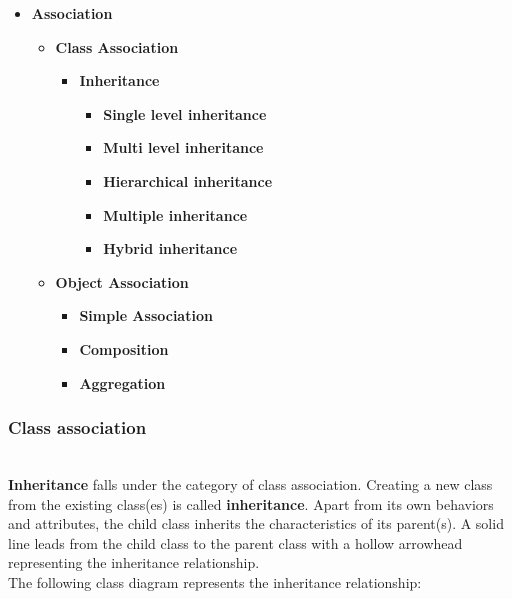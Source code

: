 \vspace{0.3cm}
\begin{itemize}
\item \textbf{Association}
\begin{itemize}
\item \textbf{Class Association}
\begin{itemize}
\item \textbf{Inheritance}
\begin{itemize}
\item \textbf{Single level inheritance}
\end{itemize}
\begin{itemize}
\item \textbf{Multi level inheritance}
\end{itemize}
\begin{itemize}
\item \textbf{Hierarchical inheritance}
\end{itemize}
\begin{itemize}
\item \textbf{Multiple inheritance}
\end{itemize}
\begin{itemize}
\item \textbf{Hybrid inheritance}
\end{itemize}
\end{itemize}
\end{itemize}
\begin{itemize}
\item \textbf{Object Association}
\begin{itemize}
\item \textbf{Simple Association}
\end{itemize}
\begin{itemize}
\item \textbf{Composition}
\end{itemize}
\begin{itemize}
\item \textbf{Aggregation}
\end{itemize}
\end{itemize}
\end{itemize}

\subsubsection{Class association}\label{class-association}
\\
\textbf{Inheritance} falls under the category of class association. Creating a new class from the existing class(es) is called \textbf{inheritance}. Apart from its own behaviors and attributes, the child class inherits the characteristics of its parent(s). A solid line leads from the child class to the parent class with a hollow arrowhead representing the inheritance relationship.
\\
The following class diagram represents the inheritance relationship:

